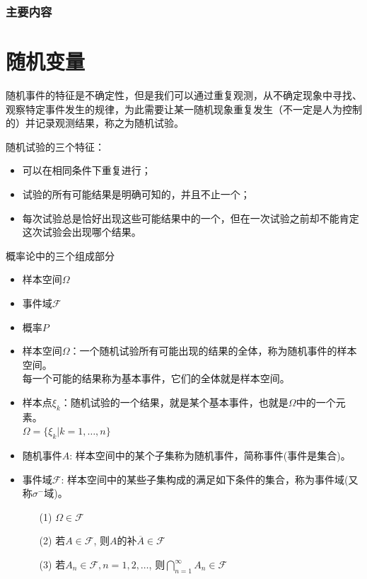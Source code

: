 \begin{frame}
  \frametitle{主要内容}
  \tableofcontents[hideallsubsections]
\end{frame}

\section{随机变量}

\begin{frame}
随机事件的特征是不确定性，但是我们可以通过重复观测，从不确定现象中寻找、观察特定事件发生的规律，为此需要让某一随机现象重复发生（不一定是人为控制的）并记录观测结果，称之为随机试验。

随机试验的三个特征：
\begin{itemize}
	\item 可以在相同条件下重复进行；
	\item 试验的所有可能结果是明确可知的，并且不止一个；
	\item 每次试验总是恰好出现这些可能结果中的一个，但在一次试验之前却不能肯定这次试验会出现哪个结果。
\end{itemize}

\end{frame}

\begin{frame}{概率论中的三个组成部分}
\begin{itemize}
	\item 样本空间$\Omega$
	\item 事件域$\mathcal{F}$
	\item 概率$P$
\end{itemize}
\end{frame}


\begin{frame}
\begin{itemize}
	\item 样本空间$\Omega$：一个随机试验所有可能出现的结果的全体，称为随机事件的样本空间。\\
	每一个可能的结果称为基本事件，它们的全体就是样本空间。
	\item 样本点$\xi_k$：随机试验的一个结果，就是某个基本事件，也就是$\Omega$中的一个元素。\\
	$\Omega=\{\xi_k|k=1,\dots,n\}$
	\item 随机事件$A$: 样本空间中的某个子集称为随机事件，简称事件(事件是集合)。
    \item 事件域$\mathcal{F}$: 样本空间中的某些子集构成的满足如下条件的集合，称为事件域(又称$\sigma^-$域)。
	\begin{itemize}
		\item[(1)] $\Omega\in\mathcal{F}$
		\item[(2)] 若$A\in\mathcal{F}$, 则$A$的补$\overline{A}\in\mathcal{F}$
		\item[(3)] 若$A_n\in\mathcal{F}, n=1,2,\dots$, 则$\bigcap\limits_{n=1}^{\infty}A_n\in\mathcal{F}$
	\end{itemize}
\end{itemize}
\end{frame}

